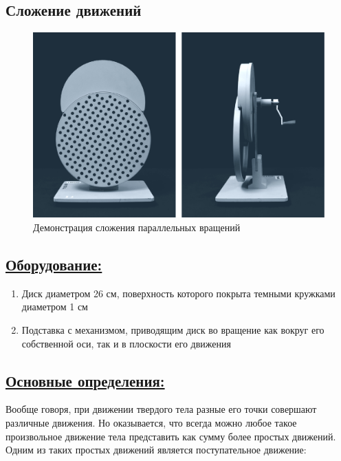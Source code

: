\documentclass[14pt,a4paper,twoside]{extarticle}	%
\begin{document}

\begin{center}
	\subsection*{Сложение движений}
\end{center}

\begin{figure}[H]
	\centering 	
	\includegraphics[width=0.9\linewidth]{aom-1.png}
	\caption{Демонстрация сложения параллельных вращений}
	\label{aom-1}
\end{figure}

\subsection*{\underline{Оборудование:}}

\begin{enumerate}
	\item Диск диаметром 26 см, поверхность которого покрыта темными кружками диаметром 1 см
	\item Подставка с механизмом, приводящим диск во вращение как вокруг его собственной оси, так и в плоскости его движения
\end{enumerate}

\newpage
\subsection*{\underline{Основные определения:}}

Вообще говоря, при движении твердого тела разные его точки 
совершают различные движения.
Но оказывается, что всегда можно 
любое такое произвольное движение тела представить как сумму 
более простых движений.
Одним из таких простых движений является поступательное движение:
\end{document}
